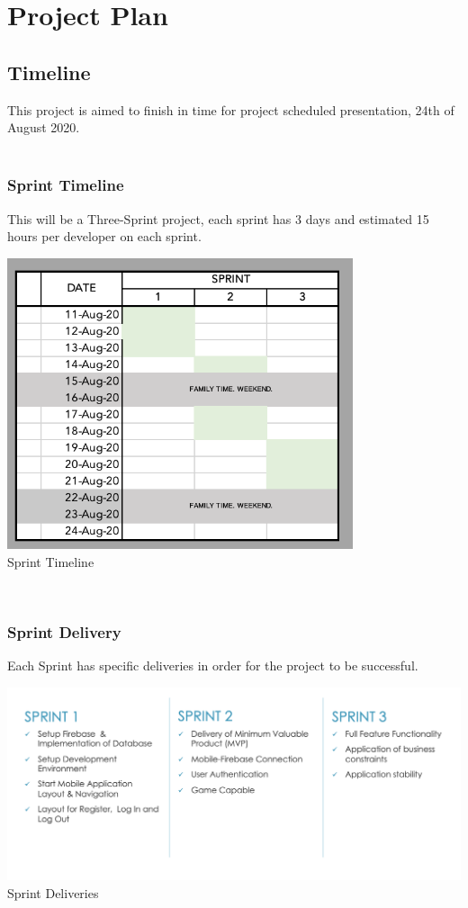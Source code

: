 \documentclass{scrartcl}
\begin{document}
\newpage

\section{Project Plan}
    \subsection{Timeline}
        This project is aimed to finish in time for project scheduled presentation, 24th of August 2020.\\\\
        \subsubsection{Sprint Timeline}
        This will be a Three-Sprint project, each sprint has 3 days and estimated 15 hours per developer on each sprint.\\
        \begin{center}
        \includegraphics[width=4in]{images/Sprint Timeline.png}\\
        \caption{Sprint Timeline}
        \end{center} 
        ~\\
        \subsubsection{Sprint Delivery}
        Each Sprint has specific deliveries in order for the project to be successful. \begin{center}
        \includegraphics[width=6in]{images/Sprint Deliveries.png}\\
        \caption{Sprint Deliveries}
        \end{center}
\end{document}
